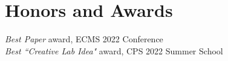 \section{\sc Honors and Awards}

\textit{Best Paper} award, ECMS 2022 Conference\\
\textit{Best ``Creative Lab Idea"} award, CPS 2022 Summer School